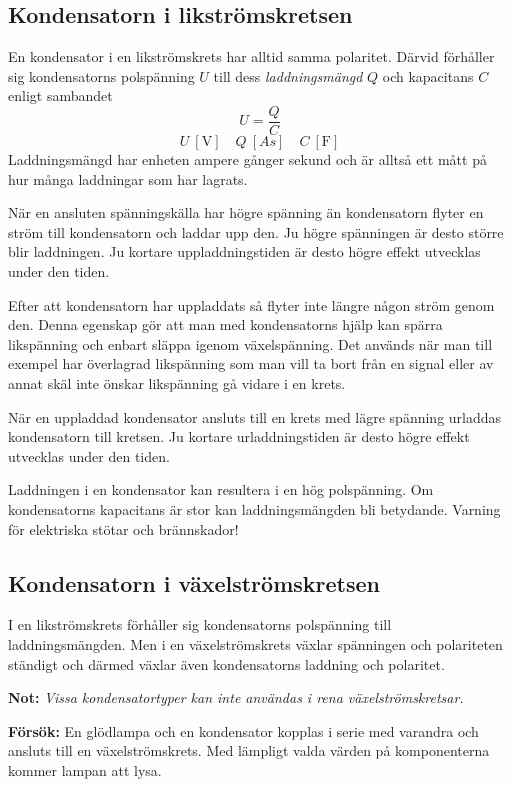 \subsection{Kondensatorn i likströmskretsen}

En kondensator i en likströmskrets har alltid samma polaritet.
Därvid förhåller sig kondensatorns polspänning \(U\) till dess
\emph{laddningsmängd} \(Q\) och kapacitans \(C\) enligt sambandet
\[U = \frac{Q}{C} \]
\[U\ [\unit{\volt}]\quad Q\ [As]\quad C\ [\unit{\farad}]\]
Laddningsmängd har enheten ampere gånger sekund och är alltså ett mått på hur
många laddningar som har lagrats.

När en ansluten spänningskälla har högre spänning än kondensatorn flyter en 
ström till kondensatorn och laddar upp den. Ju högre spänningen är desto större 
blir laddningen. Ju kortare uppladdningstiden är desto högre effekt
utvecklas under den tiden.

Efter att kondensatorn har uppladdats så flyter inte längre någon ström genom
den. Denna egenskap gör att man med kondensatorns hjälp kan spärra likspänning
och enbart släppa igenom växelspänning. Det används när man till exempel har
överlagrad likspänning som man vill ta bort från en signal eller av annat skäl
inte önskar likspänning gå vidare i en krets.

När en uppladdad kondensator ansluts till en krets med lägre spänning urladdas 
kondensatorn till kretsen. Ju kortare urladdningstiden är desto högre
effekt utvecklas under den tiden.

Laddningen i en kondensator kan resultera i en hög polspänning.
Om kondensatorns kapacitans är stor kan laddningsmängden bli betydande.
Varning för elektriska stötar och brännskador!

\subsection{Kondensatorn i växelströmskretsen}

I en likströmskrets förhåller sig kondensatorns polspänning till
laddningsmängden. Men i en växelströmskrets växlar spänningen och polariteten 
ständigt och därmed växlar även kondensatorns laddning och polaritet.

\textbf{Not:} \emph{Vissa kondensatortyper kan inte användas i rena
  växelströmskretsar.}

\textbf{Försök:} En glödlampa och en kondensator kopplas i serie
med varandra och ansluts till en växelströmskrets. Med lämpligt
valda värden på komponenterna kommer lampan att lysa.

